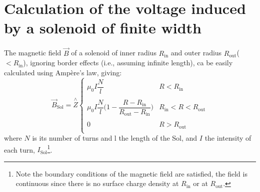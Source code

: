 \documentclass[a4paper,12pt,oneside]{book}
\begin{document}



%




\appendix %




\chapter{Calculation of the voltage induced by a solenoid of finite width}
\label{appendix_loop voltage}
The magnetic field $\vec{B}$ of a solenoid of inner radius $R_\text{in}$ and outer radius $R_\text{out}$($<R_\text{in}$), ignoring border effects (i.e., assuming infinite length), ca be easily calculated using Ampère's law, giving:
%
\begin{equation}
\vec{B}_\text{Sol}= \stackrel{\wedge}{Z}
\left\{
	\begin{array}{cc}
	\mu_0 I \dfrac{N}{l} & R < R_\text{in} \\
	\\
	 \mu_0 I \dfrac{N}{l} \Big(1- \dfrac{R-R_\text{in}}{R_\text{out}-R_\text{in}} \Big)  & R_\text{in}<R<R_\text{out} \\ 
	 \\
	0 & R> R_\text{out} \\
	\end{array}
\right.
\end{equation}
where $N$ is its number of turns and l the length of the Sol, and $I$ the intensity of each turn, $I_\text{Sol}$\footnote{Note the boundary conditions of the magnetic field are satisfied, the field is continuous since there is no surface charge density at $R_\text{in}$ or at $R_\text{out}$.}.
\end{document}
